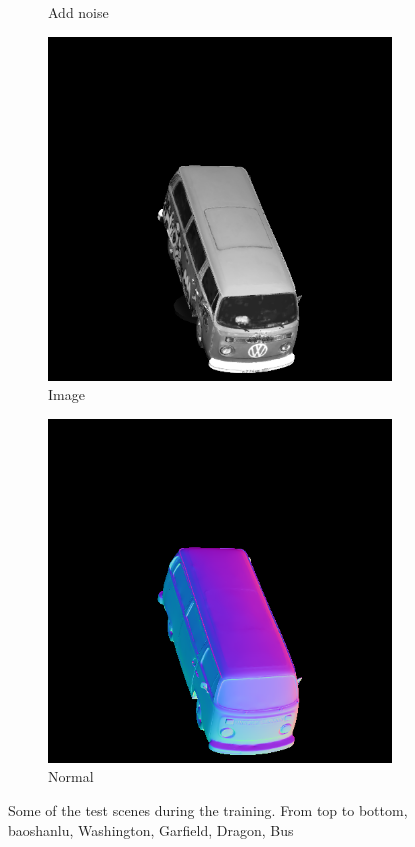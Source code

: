 \documentclass[border=15pt, multi, tikz]{article}
\begin{document}
\begin{figure}[H]
\begin{subfigure}[b]{0.24\linewidth}
		\caption{Add noise}
	\end{subfigure}
	\begin{subfigure}[b]{0.24\linewidth}
		\includegraphics[width=\linewidth]{./Figures/test_scenes/05126.image0.png}
		\caption{Image}
	\end{subfigure}
	\begin{subfigure}[b]{0.24\linewidth}
		\includegraphics[width=\linewidth]{./Figures/test_scenes/05126.normal0.png}
		\caption{Normal}
	\end{subfigure}
	
	\caption{Some of the test scenes during the training. From top to bottom, baoshanlu, Washington, Garfield, Dragon, Bus}
	\label{fig:test-scene}
\end{figure}
\end{document}
